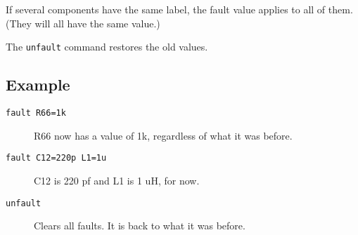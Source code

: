 If several components have the same label, the fault value applies to all of
them.  (They will all have the same value.)

The {\tt unfault} command restores the old values.
\subsection{Example}

\begin{description}

\item[{\tt fault R66=1k}] R66 now has a value of 1k, regardless of what it
was before.

\item[{\tt fault C12=220p L1=1u}] C12 is 220 pf and L1 is 1 uH, for now.

\item[{\tt unfault}] Clears all faults.  It is back to what it was before.

\end{description}
